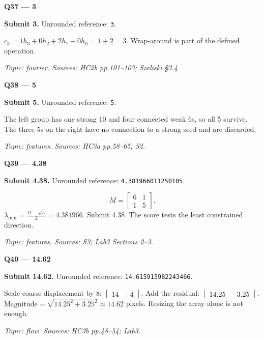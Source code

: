 \documentclass[11pt,a4paper]{article}
\begin{document}
\par\vspace{12pt}
\begin{minipage}{\linewidth}
\textbf{Q37 — 3}\par\smallskip
\textbf{Submit 3.} Unrounded reference: \texttt{3}.\par
\(c_3=1h_3+0h_2+2h_1+0h_0=1+2=3\). Wrap-around is part of the defined operation.\par
{\small\itshape Topic: fourier. Sources: HC2b pp.101–103; Szeliski §3.4.}

\end{minipage}
\par\vspace{12pt}
\begin{minipage}{\linewidth}
\textbf{Q38 — 5}\par\smallskip
\textbf{Submit 5.} Unrounded reference: \texttt{5}.\par
The left group has one strong 10 and four connected weak 6s,\allowbreak{} so all 5 survive. The three 5s on the right have no connection to a strong seed and are discarded.\par
{\small\itshape Topic: features. Sources: HC3a pp.58–65; S2.}

\end{minipage}
\par\vspace{12pt}
\begin{minipage}{\linewidth}
\textbf{Q39 — 4.38}\par\smallskip
\textbf{Submit 4.38.} Unrounded reference: \texttt{4.381966011250105}.\par

\[M=\begin{bmatrix}6&1\\1&5\end{bmatrix}.\]
 \(\lambda_{\min}=\frac{11-\sqrt{5}}{2}=4.381966\). Submit 4.38. The score tests the least constrained direction.\par
{\small\itshape Topic: features. Sources: S3; Lab3 Sections 2–3.}

\end{minipage}
\par\vspace{12pt}
\begin{minipage}{\linewidth}
\textbf{Q40 — 14.62}\par\smallskip
\textbf{Submit 14.62.} Unrounded reference: \texttt{14.615915982243466}.\par
Scale coarse displacement by 8: \(\begin{bmatrix}14&-4\end{bmatrix}\). Add the residual: \(\begin{bmatrix}14.25&-3.25\end{bmatrix}\). \(\text{Magnitude}=\sqrt{14.25^2+3.25^2}\approx14.62\) pixels. Resizing the array alone is not enough.\par
{\small\itshape Topic: flow. Sources: HC3b pp.48–54; Lab3.}

\end{minipage}
\end{document}
